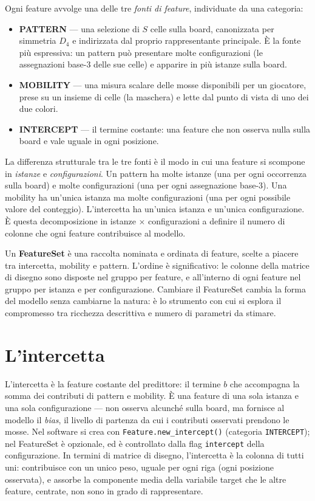 Ogni feature avvolge una delle tre \textit{fonti di feature}, individuate da una
categoria:

\begin{itemize}
    \item \textbf{PATTERN} --- una selezione di $S$ celle sulla board, canonizzata
          per simmetria $D_4$ e indirizzata dal proprio rappresentante principale. È la
          fonte più espressiva: un pattern può presentare molte configurazioni (le
          assegnazioni base-3 delle sue celle) e apparire in più istanze sulla board.
    \item \textbf{MOBILITY} --- una misura scalare delle mosse disponibili per un
          giocatore, prese su un insieme di celle (la maschera) e lette dal punto di
          vista di uno dei due colori.
    \item \textbf{INTERCEPT} --- il termine costante: una feature che non osserva
          nulla sulla board e vale uguale in ogni posizione.
\end{itemize}

La differenza strutturale tra le tre fonti è il modo in cui una feature si scompone in
\textit{istanze} e \textit{configurazioni}. Un pattern ha molte istanze (una per ogni
occorrenza sulla board) e molte configurazioni (una per ogni assegnazione base-3). Una
mobility ha un'unica istanza ma molte configurazioni (una per ogni possibile valore del
conteggio). L'intercetta ha un'unica istanza e un'unica configurazione. È questa
decomposizione in istanze $\times$ configurazioni a definire il numero di colonne che
ogni feature contribuisce al modello.

Un \textbf{FeatureSet} è una raccolta nominata e ordinata di feature, scelte a piacere
tra intercetta, mobility e pattern. L'ordine è significativo: le colonne della matrice
di disegno sono disposte nel gruppo per feature, e all'interno di ogni feature nel
gruppo per istanza e per configurazione. Cambiare il FeatureSet cambia la forma del
modello senza cambiarne la natura: è lo strumento con cui si esplora il compromesso tra
ricchezza descrittiva e numero di parametri da stimare.

\section{L'intercetta}

L'intercetta è la feature costante del predittore: il termine $b$ che accompagna la
somma dei contributi di pattern e mobility. È una feature di una sola istanza e una
sola configurazione --- non osserva alcunché sulla board, ma fornisce al modello il
\textit{bias}, il livello di partenza da cui i contributi osservati prendono le mosse.
Nel software si crea con \texttt{Feature.new\_intercept()} (categoria
\texttt{INTERCEPT}); nel FeatureSet è opzionale, ed è controllato dalla flag
\texttt{intercept} della configurazione. In termini di matrice di disegno,
l'intercetta è la colonna di tutti uni: contribuisce con un unico peso, uguale per
ogni riga (ogni posizione osservata), e assorbe la componente media della variabile
target che le altre feature, centrate, non sono in grado di rappresentare.

